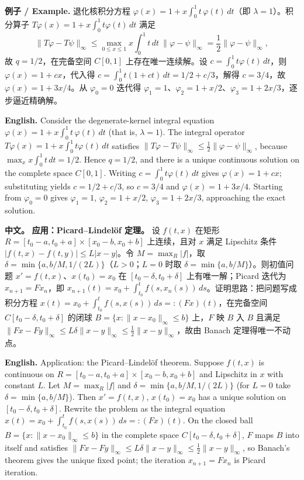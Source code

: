 \documentclass[UTF8,11pt,a4paper]{ctexart}
\newcommand{\EN}[1]{\par\noindent \textbf{English.} #1\par}
\newcommand{\EX}[2]{\par\noindent \textbf{例子 / Example.} #1\par\EN{#2}}
\newcommand{\APS}[2]{\par\noindent\textbf{中文。} #1\par\noindent\textbf{English.} #2\par\smallskip}
\begin{document}
\EX{退化核积分方程 $\varphi(x)=1+x\int_0^1t\,\varphi(t)\,dt$（即 $\lambda=1$）。积分算子 $T\varphi(x)=1+x\int_0^1t\varphi(t)\,dt$ 满足
\[
\|T\varphi-T\psi\|_\infty\le\max_{0\le x\le1}x\int_0^1t\,dt\ \|\varphi-\psi\|_\infty=\frac12\|\varphi-\psi\|_\infty,
\]
故 $q=1/2$，在完备空间 $C[0,1]$ 上存在唯一连续解。设 $c=\int_0^1t\varphi(t)\,dt$，则 $\varphi(x)=1+cx$，代入得 $c=\int_0^1t(1+ct)\,dt=1/2+c/3$，解得 $c=3/4$，故 $\varphi(x)=1+3x/4$。从 $\varphi_0=0$ 迭代得 $\varphi_1=1$、$\varphi_2=1+x/2$、$\varphi_3=1+2x/3$，逐步逼近精确解。}{Consider the degenerate-kernel integral equation $\varphi(x)=1+x\int_0^1t\,\varphi(t)\,dt$ (that is, $\lambda=1$). The integral operator $T\varphi(x)=1+x\int_0^1t\varphi(t)\,dt$ satisfies $\|T\varphi-T\psi\|_\infty\le\frac12\|\varphi-\psi\|_\infty$, because $\max_x x\int_0^1t\,dt=1/2$. Hence $q=1/2$, and there is a unique continuous solution on the complete space $C[0,1]$. Writing $c=\int_0^1t\varphi(t)\,dt$ gives $\varphi(x)=1+cx$; substituting yields $c=1/2+c/3$, so $c=3/4$ and $\varphi(x)=1+3x/4$. Starting from $\varphi_0=0$ gives $\varphi_1=1$, $\varphi_2=1+x/2$, $\varphi_3=1+2x/3$, approaching the exact solution.}

\APS{\textbf{应用：Picard--Lindel\"of 定理。} 设 $f(t,x)$ 在矩形 $R=[t_0-a,t_0+a]\times[x_0-b,x_0+b]$ 上连续，且对 $x$ 满足 Lipschitz 条件 $|f(t,x)-f(t,y)|\le L|x-y|$。令 $M=\max_R|f|$，取 $\delta=\min\{a,b/M,1/(2L)\}$（$L>0$；$L=0$ 时取 $\delta=\min\{a,b/M\}$）。则初值问题 $x'=f(t,x)$、$x(t_0)=x_0$ 在 $[t_0-\delta,t_0+\delta]$ 上有唯一解；Picard 迭代为 $x_{n+1}=Fx_n$，即 $x_{n+1}(t)=x_0+\int_{t_0}^t f(s,x_n(s))\,ds$。证明思路：把问题写成积分方程 $x(t)=x_0+\int_{t_0}^t f(s,x(s))\,ds=:(Fx)(t)$，在完备空间 $C[t_0-\delta,t_0+\delta]$ 的闭球 $B=\{x:\|x-x_0\|_\infty\le b\}$ 上，$F$ 映 $B$ 入 $B$ 且满足 $\|Fx-Fy\|_\infty\le L\delta\|x-y\|_\infty\le\frac12\|x-y\|_\infty$，故由 Banach 定理得唯一不动点。}{Application: the Picard--Lindel\"of theorem. Suppose $f(t,x)$ is continuous on $R=[t_0-a,t_0+a]\times[x_0-b,x_0+b]$ and Lipschitz in $x$ with constant $L$. Let $M=\max_R|f|$ and $\delta=\min\{a,b/M,1/(2L)\}$ (for $L=0$ take $\delta=\min\{a,b/M\}$). Then $x'=f(t,x)$, $x(t_0)=x_0$ has a unique solution on $[t_0-\delta,t_0+\delta]$. Rewrite the problem as the integral equation $x(t)=x_0+\int_{t_0}^t f(s,x(s))\,ds=:(Fx)(t)$. On the closed ball $B=\{x:\|x-x_0\|_\infty\le b\}$ in the complete space $C[t_0-\delta,t_0+\delta]$, $F$ maps $B$ into itself and satisfies $\|Fx-Fy\|_\infty\le L\delta\|x-y\|_\infty\le\frac12\|x-y\|_\infty$, so Banach's theorem gives the unique fixed point; the iteration $x_{n+1}=Fx_n$ is Picard iteration.}
\end{document}
